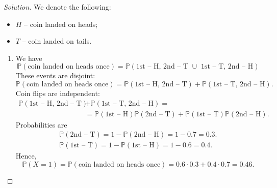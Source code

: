 \documentclass{article}[12pt]
\newenvironment{solution}
  {\renewcommand\qedsymbol{$\blacksquare$}\begin{proof}[Solution]}
  {\end{proof}}
\renewcommand{\P}{\mathbb{P}}
\begin{document}
\begin{solution}
We denote the following:
\begin{itemize}
    \item $H$ -- coin landed on heads;
    \item $T$ -- coin landed on tails.
\end{itemize}
\begin{enumerate}[label=(\alph*)]
    \item We have
    \begin{equation*}
        \P(\text{coin landed on heads once}) = \P(\text{1st -- H, 2nd -- T $\cup$ 1st -- T, 2nd -- H})
    \end{equation*}
    These events are disjoint:
    \begin{equation*}
        \P(\text{coin landed on heads once}) = \P(\text{1st -- H, 2nd -- T}) + \P(\text{1st -- T, 2nd -- H}).
    \end{equation*}
    Coin flips are independent:
    \begin{align*}
        \P(\text{1st -- H, 2nd -- T}) &+ \P(\text{1st -- T, 2nd -- H}) =
        \\
        &= \P(\text{1st -- H})\P(\text{2nd -- T}) + \P(\text{1st -- T})\P(\text{2nd -- H}).
    \end{align*}
    Probabilities are
    \begin{gather*}
        \P(\text{2nd -- T}) = 1 - \P(\text{2nd -- H}) = 1 - 0.7 = 0.3.
        \\
        \P(\text{1st -- T}) = 1 - \P(\text{1st -- H}) = 1 - 0.6 = 0.4.
    \end{gather*}
    Hence,
    \begin{equation*}
        \P(X = 1) = \P(\text{coin landed on heads once}) = 0.6\cdot 0.3 + 0.4 \cdot 0.7 = 0.46.
    \end{equation*}


\end{enumerate}
\end{solution}
\end{document}
